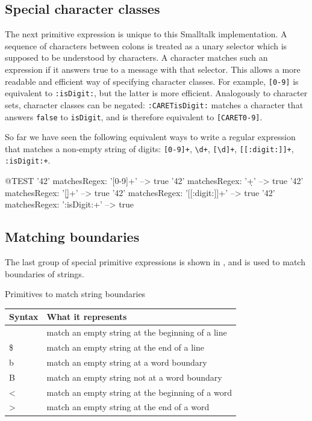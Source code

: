 \documentclass[10pt,twoside,chapterprefix=false]{scrbook}
\newcommand{\codecolor}{\color{blue!65}}
\renewcommand{\ct}{\lstinline[mathescape=false,basicstyle={\sffamily\upshape}]}
\renewcommand{\lct}[1]{{\codecolor\textsf{\textup{#1}}}}
\begin{document}
{%
\subsection{Special character classes}
The next primitive expression is unique to this Smalltalk implementation. A sequence of characters between colons is treated as a unary selector which is supposed to be understood by characters. A character matches such an expression if it answers true to a message with that selector. This allows a more readable and efficient way of specifying character classes. For example, \ct{[0-9]} is equivalent to \ct{:isDigit:}, but the latter is more efficient. Analogously to character sets, character classes can be negated: \ct{:CARETisDigit:} matches a character that answers \ct{false} to \ct{isDigit}, and is therefore equivalent to \ct{[CARET0-9]}.

So far we have seen the following equivalent ways to write a regular expression that matches a non-empty string of digits: \ct{[0-9]+}, \ct{\d+}, \ct{[\d]+}, \ct{[[:digit:]]+}, \ct{:isDigit:+}.

\begin{ToSh-code}{@TEST}
'42' matchesRegex: '[0-9]+'      --> true
'42' matchesRegex: '\d+'           --> true
'42' matchesRegex: '[\d]+'         --> true
'42' matchesRegex: '[[:digit:]]+' --> true
'42' matchesRegex: ':isDigit:+'  --> true
\end{ToSh-code}

\subsection{Matching boundaries}
The last group of special primitive expressions is shown in , and is used to match boundaries of strings.

\begin{table}[htb]
	\begin{margincap}{Primitives to match string boundaries}
	\centering
	\begin{tabular}{lp{8cm}}
		\toprule
		Syntax & What it represents \\
		\midrule
		\lct{\caret} & match an empty string at the beginning of a line\\
		\lct{\$} & match an empty string at the end of a line\\
		\lct{{\escape}b} & match an empty string at a word boundary\\
		\lct{{\escape}B} & match an empty string not at a word boundary\\
		\lct{{\escape}<} & match an empty string at the beginning of a word\\
		\lct{{\escape}>} & match an empty string at the end of a word\\
		\bottomrule
	\end{tabular}
	\label{tab:boundaries}
	\end{margincap}
\end{table}

}
\end{document}
